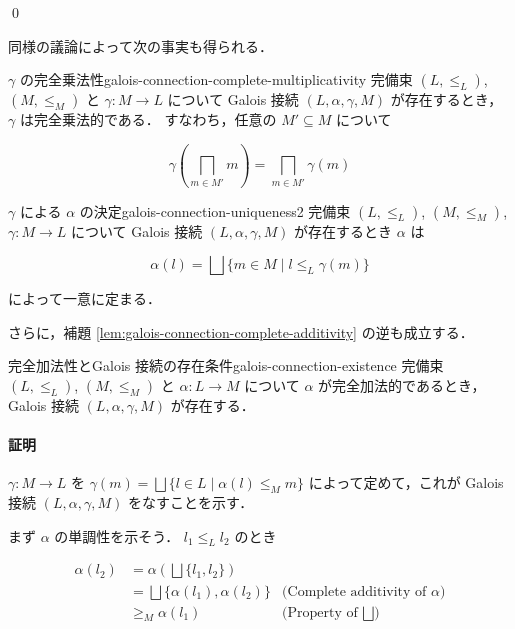 \documentclass[uplatex]{jsarticle}
\begin{document}
\qed

同様の議論によって次の事実も得られる．

\begin{boxtheorem}{$\gamma$ の完全乗法性}{galois-connection-complete-multiplicativity}
  完備束 $(L, \leq_L)$, $(M, \leq_M)$ と $\gamma: M \to L$ について
  Galois 接続 $(L, \alpha, \gamma, M)$ が存在するとき， $\gamma$ は完全乗法的である．
  すなわち，任意の $M' \subseteq M$ について

  $$
    \gamma\left( \bigsqcap_{m \in M'} m \right) = \bigsqcap_{m \in M'} \gamma(m)
  $$
\end{boxtheorem}

\begin{boxtheorem}{$\gamma$ による $\alpha$ の決定}{galois-connection-uniqueness2}
  完備束 $(L, \leq_L)$, $(M, \leq_M)$, $\gamma: M \to L$ について
  Galois 接続 $(L, \alpha, \gamma, M)$ が存在するとき $\alpha$ は

  $$
    \alpha(l) = \bigsqcup \{ m \in M \mid l \leq_L \gamma(m) \}
  $$

  によって一意に定まる．
\end{boxtheorem}

さらに，補題 \ref{lem:galois-connection-complete-additivity} の逆も成立する．

\begin{boxtheorem}{完全加法性とGalois 接続の存在条件}{galois-connection-existence}
  完備束 $(L, \leq_L)$, $(M, \leq_M)$ と $\alpha: L \to M$ について
  $\alpha$ が完全加法的であるとき， Galois 接続 $(L, \alpha, \gamma, M)$ が存在する．
\end{boxtheorem}

\paragraph*{証明}


$\gamma: M \to L$ を
$\gamma(m) = \bigsqcup \{ l \in L \mid \alpha(l) \leq_M m \}$ によって定めて，これが
Galois 接続 $(L, \alpha, \gamma, M)$ をなすことを示す．

まず $\alpha$ の単調性を示そう． $l_1 \leq_L l_2$ のとき

\begin{align*}
  \alpha(l_2) & = \alpha( \bigsqcup \{l_1, l_2\} )         \\
              & = \bigsqcup \{ \alpha(l_1), \alpha(l_2) \}
              & \text{(Complete additivity of $\alpha$)}   \\
              & \geq_M \alpha(l_1)
              & \text{(Property of $\bigsqcup$)}
\end{align*}
\end{document}
